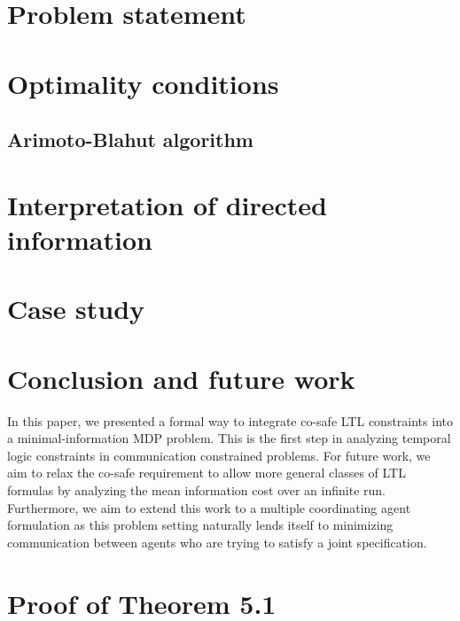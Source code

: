 \documentclass[letterpaper, 10 pt, conference]{ieeeconf}  %
\begin{document}





\section{Problem statement}





\section{Optimality conditions}



\subsection{Arimoto-Blahut algorithm}


\section{Interpretation of directed information}\label{sec:ab}



\section{Case study}


\section{Conclusion and future work}
In this paper, we presented a formal way to integrate co-safe LTL constraints into a minimal-information MDP problem. This is the first step in analyzing temporal logic constraints in communication constrained problems. For future work, we aim to relax the co-safe requirement to allow more general classes of LTL formulas by analyzing the mean information cost over an infinite run. Furthermore, we aim to extend this work to a multiple coordinating agent formulation as this problem setting naturally lends itself to minimizing communication between agents who are trying to satisfy a joint specification. 






\appendices
\vspace{-0.15cm}
\section{Proof of Theorem 5.1} \label{sec:prf}

\end{document}
